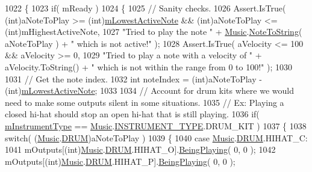 \begin{DoxyCodeInclude}
1022     \{
1023         \textcolor{keywordflow}{if}( mReady )
1024         \{
1025             \textcolor{comment}{// Sanity checks.}
1026             Assert.IsTrue( (\textcolor{keywordtype}{int})aNoteToPlay >= (\textcolor{keywordtype}{int})\hyperlink{group___v_i_m_priv_ga5e3a5116e0dabb37e0ea21d73ac1567e}{mLowestActiveNote} && (\textcolor{keywordtype}{int})aNoteToPlay 
      <= (\textcolor{keywordtype}{int})mHighestActiveNote,
1027                 \textcolor{stringliteral}{"Tried to play the note "} + \hyperlink{class_music}{Music}.\hyperlink{group___music_stat_func_ga85a22c905d56d4c5f4e62159bfecee8c}{NoteToString}( aNoteToPlay ) + \textcolor{stringliteral}{" which is
       not active!"} );
1028             Assert.IsTrue( aVelocity <= 100 && aVelocity >= 0,
1029                 \textcolor{stringliteral}{"Tried to play a note with a velocity of "} + aVelocity.ToString() + \textcolor{stringliteral}{" which is not within
       the range from 0 to 100!"} );
1030 
1031             \textcolor{comment}{// Get the note index.}
1032             \textcolor{keywordtype}{int} noteIndex = (int)aNoteToPlay - (\textcolor{keywordtype}{int})\hyperlink{group___v_i_m_priv_ga5e3a5116e0dabb37e0ea21d73ac1567e}{mLowestActiveNote};
1033 
1034             \textcolor{comment}{// Account for drum kits where we would need to make some outputs silent in some situations.}
1035             \textcolor{comment}{// Ex: Playing a closed hi-hat should stop an open hi-hat that is still playing.}
1036             \textcolor{keywordflow}{if}( \hyperlink{group___v_i_m_priv_ga108c350257b3a2080e06cd4a8251f6a4}{mInstrumentType} == \hyperlink{class_music}{Music}.\hyperlink{group___music_enums_gabfce60192305965558a36e368ebd67c3}{INSTRUMENT\_TYPE}.DRUM\_KIT )
1037             \{
1038                 \textcolor{keywordflow}{switch}( (\hyperlink{class_music}{Music}.\hyperlink{group___music_enums_gade475b4382c7066d1af13e7c13c029b6}{DRUM})aNoteToPlay )
1039                 \{
1040                     \textcolor{keywordflow}{case} \hyperlink{class_music}{Music}.\hyperlink{group___music_enums_gade475b4382c7066d1af13e7c13c029b6}{DRUM}.HIHAT\_C:
1041                         mOutputs[(int)\hyperlink{class_music}{Music}.\hyperlink{group___music_enums_gade475b4382c7066d1af13e7c13c029b6}{DRUM}.HIHAT\_O].\hyperlink{group___n_o_o_pub_func_ga2bdaa2787408f353f71ef6c6a18e9285}{BeingPlaying}( 0, 0 );
1042                         mOutputs[(int)\hyperlink{class_music}{Music}.\hyperlink{group___music_enums_gade475b4382c7066d1af13e7c13c029b6}{DRUM}.HIHAT\_P].\hyperlink{group___n_o_o_pub_func_ga2bdaa2787408f353f71ef6c6a18e9285}{BeingPlaying}( 0, 0 );

\end{DoxyCodeInclude}
